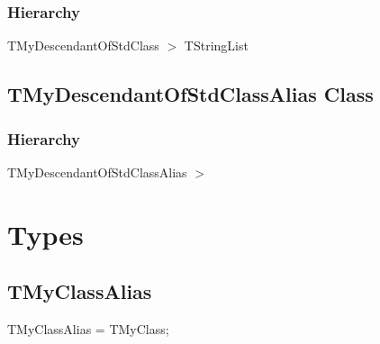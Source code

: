 \documentclass{report}
\newif\ifpdf
\begin{document}
\subsubsection*{\large{\textbf{Hierarchy}}\normalsize\hspace{1ex}\hfill}
TMyDescendantOfStdClass {$>$} TStringList
\ifpdf
\subsection*{\large{\textbf{TMyDescendantOfStdClassAlias Class}}\normalsize\hspace{1ex}\hrulefill}
\else
\subsection*{TMyDescendantOfStdClassAlias Class}
\fi
\label{ok_ancestors_links.TMyDescendantOfStdClassAlias}
\subsubsection*{\large{\textbf{Hierarchy}}\normalsize\hspace{1ex}\hfill}
TMyDescendantOfStdClassAlias {$>$} %
\section{Types}
\ifpdf
\subsection*{\large{\textbf{TMyClassAlias}}\normalsize\hspace{1ex}\hrulefill}
\else
\subsection*{TMyClassAlias}
\fi
\label{ok_ancestors_links-TMyClassAlias}
\begin{list}{}{
\setlength{\itemindent}{0cm}
\setlength{\listparindent}{0cm}
\setlength{\leftmargin}{\evensidemargin}
\addtolength{\leftmargin}{\tmplength}
\settowidth{\labelsep}{X}
\addtolength{\leftmargin}{\labelsep}
\setlength{\labelwidth}{\tmplength}
}
\item[\textbf{Declaration}\hfill]
\ifpdf
\begin{flushleft}
\fi
\begin{ttfamily}
TMyClassAlias = TMyClass;\end{ttfamily}

\ifpdf
\end{flushleft}
\fi

\end{list}
\ifpdf
\end{document}
